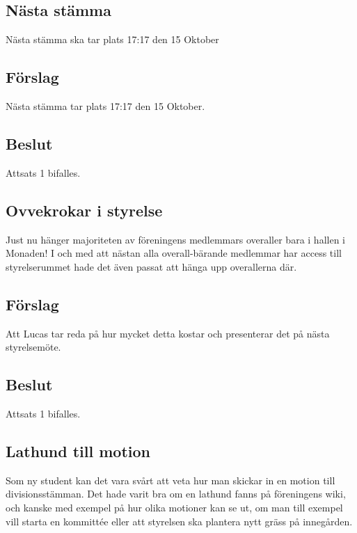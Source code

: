 \documentclass[protokoll]{dvd}
\begin{document}
\subsection*{Nästa stämma}

Nästa stämma ska tar plats 17:17 den 15 Oktober

\subsection{Förslag}
\begin{attsatser}
    \item Nästa stämma tar plats 17:17 den 15 Oktober.
\end{attsatser}
\subsection{Beslut}
Attsats 1 bifalles.
\subsection*{}

\subsection*{Ovvekrokar i styrelse}
Just nu hänger majoriteten av föreningens medlemmars overaller bara i hallen i Monaden!
I och med att nästan alla overall-bärande medlemmar har access till styrelserummet hade det även passat att hänga upp overallerna där.


\subsection{Förslag}
\begin{attsatser}
    \item Att Lucas tar reda på hur mycket detta kostar och presenterar det på nästa styrelsemöte.
\end{attsatser}
\subsection{Beslut}
Attsats 1 bifalles.

\subsection*{Lathund till motion}

Som ny student kan det vara svårt att veta hur man skickar in en motion till divisionsstämman.
Det hade varit bra om en lathund fanns på föreningens wiki, och kanske med exempel på hur olika motioner kan se ut, om man till
exempel vill starta en kommittée eller att styrelsen ska plantera nytt gräss på innegården.
\end{document}

